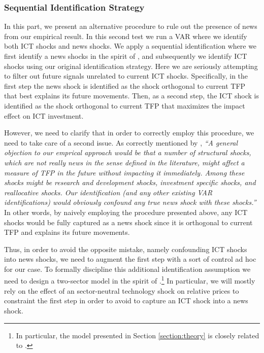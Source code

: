 \documentclass[12pt]{article}
\begin{document}
\subsubsection{Sequential Identification Strategy}\label{section:twosteps}

In this part, we present an alternative procedure to rule out the presence of news from our empirical result. In this second test we run a VAR where we identify both ICT shocks and news shocks. We apply a sequential identification where we first identify a news shocks in the spirit of \cite{barsky2011news}, and subsequently we identify ICT shocks using our original identification strategy. Here we are seriously attempting to filter out future signals unrelated to current ICT shocks. Specifically, in the first step the news shock is identified as the shock orthogonal to current TFP that best explains its future movements. Then, as a second step, the ICT shock is identified as the shock orthogonal to current TFP that maximizes the impact effect on ICT investment. 

However, we need to clarify that in order to correctly employ this procedure, we need to take care of a second issue. As correctly mentioned by \cite{barsky2011news}, \textit{``A general objection to our emprical approach would be that a number of structural shocks, which are not really news in the sense defined in the literature, might affect a measure of TFP in the future without impacting it immediately. Among these shocks might be research and development shocks, investment specific shocks, and reallocative shocks. Our identification (and any other existing VAR identifications) would obviously confound any true news shock with these shocks.''} In other words, by naively employing the procedure presented above, any ICT shocks would be fully captured as a news shock since it is orthogonal to current TFP and explains its future movements. 

Thus, in order to avoid the opposite mistake, namely confounding ICT shocks into news shocks, we need to augment the first step with a sort of control ad hoc for our case. To formally discipline this additional identification assumption we need to design a two-sector model in the spirit of \cite{greenwood1997long}.\footnote{In particular, the model presented in Section \ref{section:theory} is closely related to \cite{oulton2007investment}.} In particular, we will mostly rely on the effect of an sector-neutral technology shock on relative prices to constraint the first step in order to avoid to capture an ICT shock into a news shock.
\end{document}
